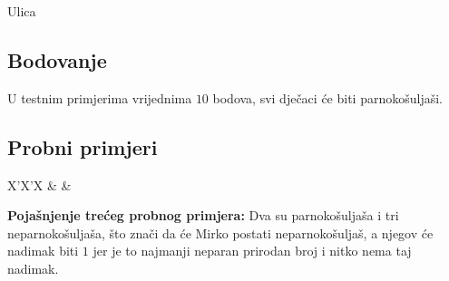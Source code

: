 \begin{statement}[
  problempoints=30,
  timelimit=1 sekunda,
  memorylimit=512 MiB,
]{Ulica}
\subsection*{Bodovanje}
U testnim primjerima vrijednima $10$ bodova, svi dječaci će biti parnokošuljaši.

\subsection*{Probni primjeri}
\begin{tabularx}{\textwidth}{X'X'X}
 &
 &
\end{tabularx}

\textbf{Pojašnjenje trećeg probnog primjera:}
Dva su parnokošuljaša i tri neparnokošuljaša, što znači da će Mirko postati
neparnokošuljaš, a njegov će nadimak biti $1$ jer je to najmanji neparan
prirodan broj i nitko nema taj nadimak.

\end{statement}

